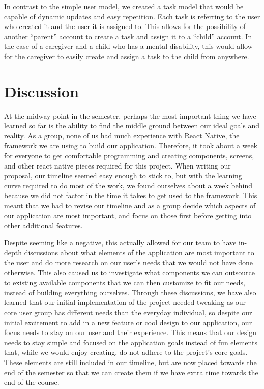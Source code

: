 \documentclass{sigchi}
\begin{document}
In contrast to the simple user model, we created a task model that would be
capable of dynamic updates and easy repetition. Each task is referring to the
user who created it and the user it is assigned to. This allows for the
possibility of another ``parent'' account to create a task and assign it to a
``child'' account. In the case of a caregiver and a child who has a mental
disability, this would allow for the caregiver to easily create and assign a
task to the child from anywhere.

\section{Discussion}

At the midway point in the semester, perhaps the most important thing we have
learned so  far is the ability to find the middle ground between our ideal goals
and reality. As a group, none of us had much experience with React Native, the
framework we are using to build our application. Therefore, it took about a
week for everyone to get comfortable programming and creating components,
screens, and other react native pieces required for this project. When writing
our proposal, our timeline seemed easy enough to stick to, but with the learning
curve required to do most of the work, we found ourselves about a week behind
because we did not factor in the time it takes to get used to the framework.
This meant that we had to revise our timeline and as a group decide which
aspects of our application are most important, and focus on those first before
getting into other additional features. 

Despite seeming like a negative, this actually allowed for our team to have
in-depth discussions about what elements of the application are most important
to the user and do more research on our user’s needs that we would not have done
otherwise. This also caused us to investigate what components we can outsource
to existing available components that we can then customize to fit our needs,
instead of building everything ourselves. Through these discussions, we have
also learned that our initial implementation of the project needed tweaking as
our core user group has different needs than the everyday individual, so despite
our initial excitement to add in a new feature or cool design to our
application, our focus needs to stay on our user and their experience. This
means that our  design needs to stay simple and focused on the application goals
instead of fun elements that, while we would enjoy creating, do not adhere to the
project’s core goals. These elements are still included in our timeline, but are
now placed towards the end of the semester so that we can create them if we have
extra time towards the end of the course.
\end{document}
